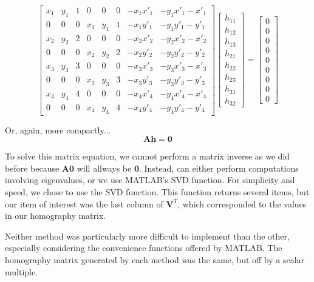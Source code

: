 \documentclass[11pt, letterpaper]{article}
\begin{document}
\[
\begin{bmatrix}
  x_1 & y_1 & 1 & 0 & 0 & 0 & -x_1x'_1 & -y_1x'_1 -x'_1 \\
  0 & 0 & 0 & x_1 & y_1 & 1 & -x_1y'_1 & -y_1y'_1 -y'_1 \\
  x_2 & y_2 & 2 & 0 & 0 & 0 & -x_2x'_2 & -y_2x'_2 -x'_2 \\
  0 & 0 & 0 & x_2 & y_2 & 2 & -x_2y'_2 & -y_2y'_2 -y'_2 \\
  x_3 & y_3 & 3 & 0 & 0 & 0 & -x_3x'_3 & -y_3x'_3 -x'_3 \\
  0 & 0 & 0 & x_3 & y_3 & 3 & -x_3y'_3 & -y_3y'_3 -y'_3 \\
  x_4 & y_4 & 4 & 0 & 0 & 0 & -x_4x'_4 & -y_4x'_4 -x'_4 \\
  0 & 0 & 0 & x_4 & y_4 & 4 & -x_4y'_4 & -y_4y'_4 -y'_4
\end{bmatrix}
\begin{bmatrix}
  h_{11} \\ h_{12} \\ h_{13} \\ h_{21} \\ h_{22} \\ h_{23} \\ h_{31} \\ h_{32} 
\end{bmatrix}
=
\begin{bmatrix}
  0 \\   0 \\   0 \\   0 \\   0 \\   0 \\   0 \\   0 \\   0 
\end{bmatrix}
\]

Or, again, more compactly...
\[
\mathbf{A}\mathbf{h}=\mathbf{0}
\]

To solve this matrix equation, we cannot perform a matrix inverse as
we did before because $\mathbf{A}\mathbf{0}$ will allways be
$\mathbf{0}$. Instead, can either perform computations involving
eigenvalues, or we use MATLAB's SVD function. For simplicity and
speed, we chose to use the SVD function. This function returns several
items, but our item of interest was the last column of $\mathbf{V}^T$,
which corresponded to the values in our homography matrix.

Neither method was particularly more difficult to implement than the
other, especially considering the convenience functions offered by
MATLAB. The homography matrix generated by each method was the same,
but off by a scalar multiple. 
\end{document}
